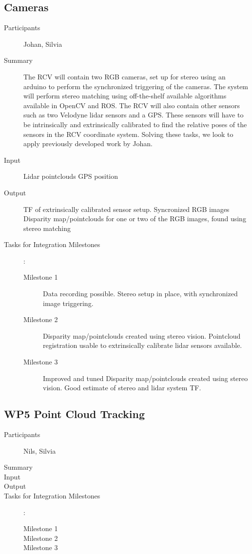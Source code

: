 \documentclass[11pt,a4paper]{article}
\begin{document}
\subsection{Cameras} %
\begin{description}
\item[Participants] Johan, Silvia
\item[Summary]

The RCV will contain two RGB cameras, set up for stereo using an arduino to perform the synchronized triggering of the cameras. The system will perform stereo matching using off-the-shelf available algorithms available in OpenCV and ROS. The RCV will also contain other sensors such as two Velodyne lidar sensors and a GPS. These sensors will have to be intrinsically and extrinsically calibrated to find the relative poses of the sensors in the RCV coordinate system. Solving these tasks, we look to apply previously developed work by Johan. 

\item[Input]
	Lidar pointclouds
	GPS position
\item[Output]
	TF of extrinsically calibrated sensor setup.
	Syncronized RGB images
	Disparity map/pointclouds for one or two of the RGB images, found using stereo matching
\item[Tasks for Integration Milestones]:\
	\begin{description}
		\item[Milestone 1]
			Data recording possible.
			Stereo setup in place, with synchronized image triggering.
		\item[Milestone 2]
			Disparity map/pointclouds created using stereo vision.
			Pointcloud registration usable to extrinsically calibrate lidar sensors available.
		\item[Milestone 3]
			Improved and tuned Disparity map/pointclouds created using stereo vision.
			Good estimate of stereo and lidar system TF.
	\end{description}	 
\end{description}

\subsection{WP5 Point Cloud Tracking}

\begin{description}
\item[Participants] Nils, Silvia
\item[Summary]
\item[Input]
\item[Output]
\item[Tasks for Integration Milestones]:\
	\begin{description}
		\item[Milestone 1]
		\item[Milestone 2]
		\item[Milestone 3] 
	\end{description}	 
\end{description}
\end{document}
